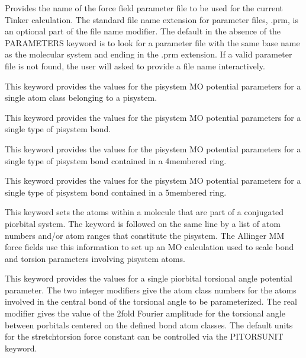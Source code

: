 \documentclass[letterpaper,11pt,english]{sphinxmanual}
\begin{document}
  Provides the name of the force field parameter file to be used for the current Tinker calculation. The standard file name extension for parameter files, .prm, is an optional part of the file name modifier. The default in the absence of the PARAMETERS keyword is to look for a parameter file with the same base name as the molecular system and ending in the .prm extension. If a valid parameter file is not found, the user will asked to provide a file name interactively.

  This keyword provides the values for the pisystem MO potential parameters for a single atom class belonging to a pisystem.

  This keyword provides the values for the pisystem MO potential parameters for a single type of pisystem bond.

  This keyword provides the values for the pisystem MO potential parameters for a single type of pisystem bond contained in a 4\sphinxhyphen{}membered ring.

  This keyword provides the values for the pisystem MO potential parameters for a single type of pisystem bond contained in a 5\sphinxhyphen{}membered ring.

  This keyword sets the atoms within a molecule that are part of a conjugated pi\sphinxhyphen{}orbital system. The keyword is followed on the same line by a list of atom numbers and/or atom ranges that constitute the pi\sphinxhyphen{}system. The Allinger MM force fields use this information to set up an MO calculation used to scale bond and torsion parameters involving pi\sphinxhyphen{}system atoms.

  This keyword provides the values for a single pi\sphinxhyphen{}orbital torsional angle potential parameter. The two integer modifiers give the atom class numbers for the atoms involved in the central bond of the torsional angle to be parameterized. The real modifier gives the value of the 2\sphinxhyphen{}fold Fourier amplitude for the torsional angle between p\sphinxhyphen{}orbitals centered on the defined bond atom classes. The default units for the stretch\sphinxhyphen{}torsion force constant can be controlled via the PITORSUNIT keyword.
\end{document}
